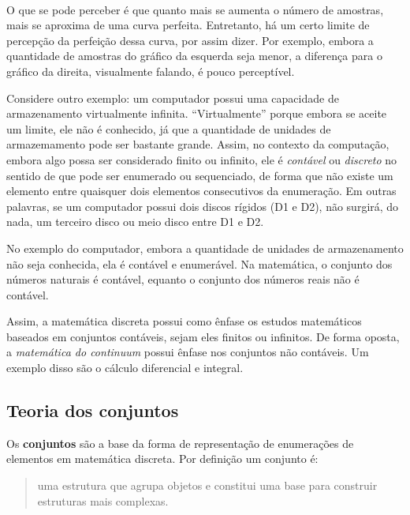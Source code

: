\documentclass{article}
\begin{document}
    \begin{center}
    \end{center}
    { \hspace*{\fill} \\}
    
    O que se pode perceber é que quanto mais se aumenta o número de
amostras, mais se aproxima de uma curva perfeita. Entretanto, há um
certo limite de percepção da perfeição dessa curva, por assim dizer. Por
exemplo, embora a quantidade de amostras do gráfico da esquerda seja
menor, a diferença para o gráfico da direita, visualmente falando, é
pouco perceptível.

Considere outro exemplo: um computador possui uma capacidade de
armazenamento virtualmente infinita. ``Virtualmente'' porque embora se
aceite um limite, ele não é conhecido, já que a quantidade de unidades
de armazemamento pode ser bastante grande. Assim, no contexto da
computação, embora algo possa ser considerado finito ou infinito, ele é
\emph{contável} ou \emph{discreto} no sentido de que pode ser enumerado
ou sequenciado, de forma que não existe um elemento entre quaisquer dois
elementos consecutivos da enumeração. Em outras palavras, se um
computador possui dois discos rígidos (D1 e D2), não surgirá, do nada,
um terceiro disco ou meio disco entre D1 e D2.

No exemplo do computador, embora a quantidade de unidades de
armazenamento não seja conhecida, ela é contável e enumerável. Na
matemática, o conjunto dos números naturais é contável, equanto o
conjunto dos números reais não é contável.

Assim, a matemática discreta possui como ênfase os estudos matemáticos
baseados em conjuntos contáveis, sejam eles finitos ou infinitos. De
forma oposta, a \emph{matemática do continuum} possui ênfase nos
conjuntos não contáveis. Um exemplo disso são o cálculo diferencial e
integral.


    \subsection{Teoria dos conjuntos}


    Os \textbf{conjuntos} são a base da forma de representação de
enumerações de elementos em matemática discreta. Por definição um
conjunto é:

\begin{quote}
uma estrutura que agrupa objetos e constitui uma base para construir
estruturas mais complexas.
\end{quote}
\end{document}

